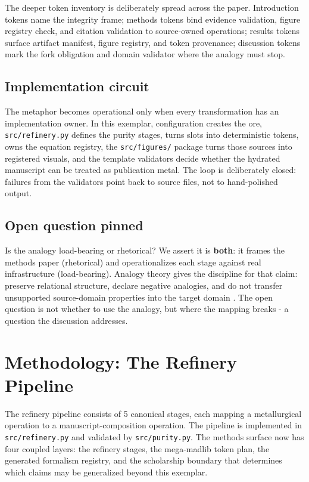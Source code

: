 \documentclass[
]{article}
\begin{document}
The deeper token inventory is deliberately spread across the paper.
Introduction tokens name the integrity frame; methods tokens bind
evidence validation, figure registry check, and citation validation to
source-owned operations; results tokens surface artifact manifest,
figure registry, and token provenance; discussion tokens mark the fork
obligation and domain validator where the analogy must stop.

\subsection{Implementation circuit}\label{implementation-circuit}

The metaphor becomes operational only when every transformation has an
implementation owner. In this exemplar, configuration creates the ore,
\texttt{src/refinery.py} defines the purity stages,
 turns slots into deterministic tokens,
 owns the equation registry, the
\texttt{src/figures/} package turns those sources into registered
visuals, and the template validators decide whether the hydrated
manuscript can be treated as publication metal. The loop is deliberately
closed: failures from the validators point back to source files, not to
hand-polished output.

\subsection{Open question pinned}\label{open-question-pinned}

Is the analogy load-bearing or rhetorical? We assert it is
\textbf{both}: it frames the methods paper (rhetorical) and
operationalizes each stage against real infrastructure (load-bearing).
Analogy theory gives the discipline for that claim: preserve relational
structure, declare negative analogies, and do not transfer unsupported
source-domain properties into the target domain
\citep{gentner1983structure, hesse1966models, holyoak_thagard_1995}. The
open question is not whether to use the analogy, but where the mapping
breaks - a question the discussion addresses.

\newpage

\section{Methodology: The Refinery Pipeline}\label{sec:methodology}

The refinery pipeline consists of 5 canonical stages, each mapping a
metallurgical operation to a manuscript-composition operation. The
pipeline is implemented in \texttt{src/refinery.py} and validated by
\texttt{src/purity.py}. The methods surface now has four coupled layers:
the refinery stages, the mega-madlib token plan, the generated formalism
registry, and the scholarship boundary that determines which claims may
be generalized beyond this exemplar.
\end{document}
